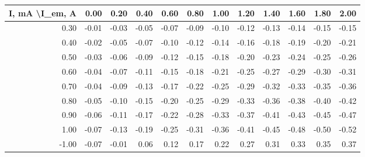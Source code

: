 \documentclass[a4paper]{article}
\begin{document}
\begin{table}[]
\begin{tabular}{|r|r|r|r|r|r|r|r|r|r|r|r|}
\hline
\multicolumn{1}{|l|}{I, mA \textbackslash I\_em, A} & 0.00  & 0.20  & 0.40  & 0.60  & 0.80  & 1.00  & 1.20  & 1.40  & 1.60  & 1.80  & 2.00  \\ \hline
0.30                                                & -0.01 & -0.03 & -0.05 & -0.07 & -0.09 & -0.10 & -0.12 & -0.13 & -0.14 & -0.15 & -0.15 \\ \hline
0.40                                                & -0.02 & -0.05 & -0.07 & -0.10 & -0.12 & -0.14 & -0.16 & -0.18 & -0.19 & -0.20 & -0.21 \\ \hline
0.50                                                & -0.03 & -0.06 & -0.09 & -0.12 & -0.15 & -0.18 & -0.20 & -0.23 & -0.24 & -0.25 & -0.26 \\ \hline
0.60                                                & -0.04 & -0.07 & -0.11 & -0.15 & -0.18 & -0.21 & -0.25 & -0.27 & -0.29 & -0.30 & -0.31 \\ \hline
0.70                                                & -0.04 & -0.09 & -0.13 & -0.17 & -0.22 & -0.25 & -0.29 & -0.32 & -0.33 & -0.35 & -0.36 \\ \hline
0.80                                                & -0.05 & -0.10 & -0.15 & -0.20 & -0.25 & -0.29 & -0.33 & -0.36 & -0.38 & -0.40 & -0.42 \\ \hline
0.90                                                & -0.06 & -0.11 & -0.17 & -0.22 & -0.28 & -0.33 & -0.37 & -0.41 & -0.43 & -0.45 & -0.47 \\ \hline
1.00                                                & -0.07 & -0.13 & -0.19 & -0.25 & -0.31 & -0.36 & -0.41 & -0.45 & -0.48 & -0.50 & -0.52 \\ \hline
-1.00                                               & -0.07 & -0.01 & 0.06  & 0.12  & 0.17  & 0.22  & 0.27  & 0.31  & 0.33  & 0.35  & 0.37  \\ \hline
\end{tabular}
\end{table}
\end{document}
